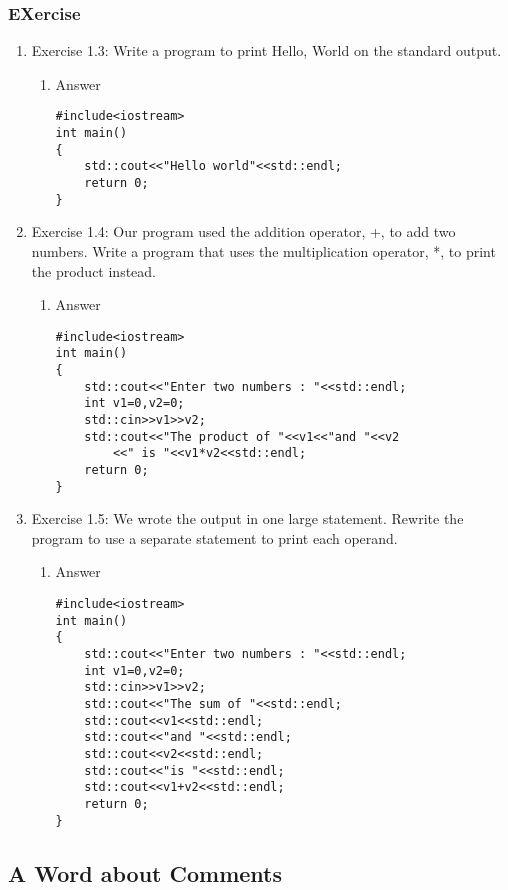 \documentclass[11pt]{article}
\begin{document}
\subsubsection{EXercise}
\label{sec-1-2-7}
\begin{enumerate}
\item Exercise 1.3: Write a program to print Hello, World on the standard output.
\label{sec-1-2-7-1}
\begin{enumerate}
\item Answer
\label{sec-1-2-7-1-1}
\begin{verbatim}
#include<iostream>
int main()
{
    std::cout<<"Hello world"<<std::endl;
    return 0;
}
\end{verbatim}
\end{enumerate}
\item Exercise 1.4: Our program used the addition operator, +, to add two numbers. Write a program that uses the multiplication operator, *, to print the product instead.
\label{sec-1-2-7-2}
\begin{enumerate}
\item Answer
\label{sec-1-2-7-2-1}
\begin{verbatim}
#include<iostream>
int main()
{
    std::cout<<"Enter two numbers : "<<std::endl;
    int v1=0,v2=0;
    std::cin>>v1>>v2;
    std::cout<<"The product of "<<v1<<"and "<<v2
        <<" is "<<v1*v2<<std::endl;
    return 0;
}
\end{verbatim}
\end{enumerate}
\item Exercise 1.5: We wrote the output in one large statement. Rewrite the program to use a separate statement to print each operand.
\label{sec-1-2-7-3}
\begin{enumerate}
\item Answer
\label{sec-1-2-7-3-1}
\begin{verbatim}
#include<iostream>
int main()
{
    std::cout<<"Enter two numbers : "<<std::endl;
    int v1=0,v2=0;
    std::cin>>v1>>v2;
    std::cout<<"The sum of "<<std::endl;
    std::cout<<v1<<std::endl;
    std::cout<<"and "<<std::endl;
    std::cout<<v2<<std::endl;
    std::cout<<"is "<<std::endl;
    std::cout<<v1+v2<<std::endl;
    return 0;
}
\end{verbatim}
\end{enumerate}
\end{enumerate}
\subsection{A Word about Comments}
\label{sec-1-3}
\end{document}
